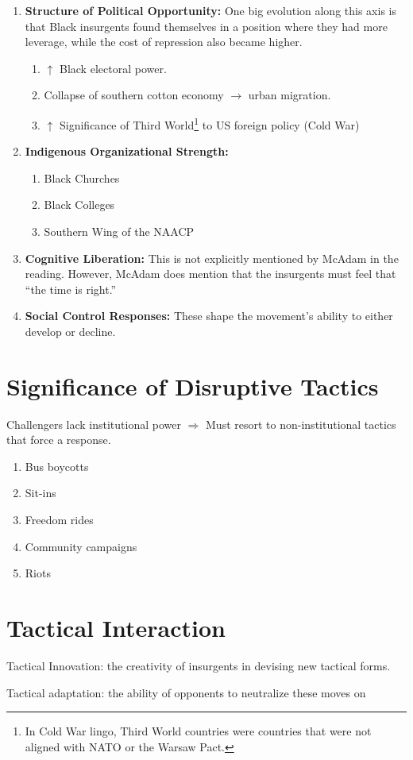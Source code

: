 \begin{enumerate}
    \item \textbf{Structure of Political Opportunity:}
    One big evolution along this axis is that Black insurgents found themselves in a position where they had more leverage, while the cost of repression also became higher.
    \begin{enumerate}
        \item $\uparrow$ Black electoral power.
        \item Collapse of southern cotton economy $\rightarrow$ urban migration.
        \item $\uparrow$ Significance of Third World\footnote{In Cold War lingo, Third World countries were countries that were not aligned with NATO or the Warsaw Pact.} to US foreign policy (Cold War)
        
    \end{enumerate}
    \item \textbf{Indigenous Organizational Strength:}
    \begin{enumerate}
        \item Black Churches
        \item Black Colleges
        \item Southern Wing of the NAACP
    \end{enumerate}
    \item \textbf{Cognitive Liberation:}
    This is not explicitly mentioned by McAdam in the reading.
    However, McAdam does mention that the insurgents must feel that ``the time is right.''
    \item \textbf{Social Control Responses:}
    These shape the movement's ability to either develop or decline.
\end{enumerate}

\section{Significance of Disruptive Tactics}

Challengers lack institutional power $\Rightarrow$ Must resort to non-institutional tactics that force a response.

\begin{enumerate}
    \item Bus boycotts
    \item Sit-ins
    \item Freedom rides
    \item Community campaigns
    \item Riots
\end{enumerate}

\section{Tactical Interaction}

Tactical Innovation: the creativity of insurgents in devising new tactical forms.

Tactical adaptation: the ability of opponents to neutralize these moves on 


